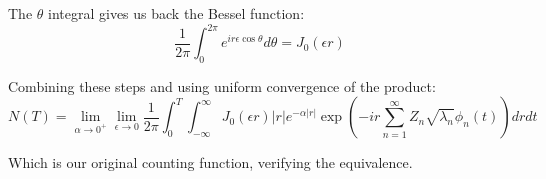 \documentclass{article}
\begin{document}
The $\theta$ integral gives us back the Bessel function:
\begin{equation}
    \frac{1}{2\pi} \int_0^{2\pi} e^{ir\epsilon\cos\theta} d\theta = J_0(\epsilon r)
\end{equation}

Combining these steps and using uniform convergence of the product:
\begin{equation}
    N(T) = \lim_{\alpha \to 0^+} \lim_{\epsilon \to 0} \frac{1}{2\pi} \int_0^T \int_{-\infty}^{\infty} J_0(\epsilon r)|r|e^{-\alpha|r|} \exp\left(-ir\sum_{n=1}^{\infty} Z_n \sqrt{\lambda_n} \phi_n(t)\right) dr dt
\end{equation}

Which is our original counting function, verifying the equivalence.
\end{document}
